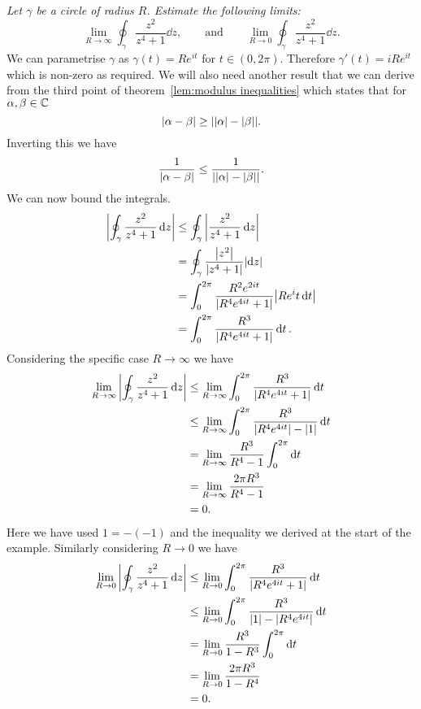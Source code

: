 \documentclass{article}
\begin{document}
    \begin{example}
        \textit{Let \(\gamma\) be a circle of radius \(R\).
        Estimate the following limits:}
        \[\lim_{R\to\infty} \oint_{\gamma} \frac{z^2}{z^4 + 1}\dd{z}, \qquad\text{and}\qquad \lim_{R\to 0} \oint_{\gamma} \frac{z^2}{z^4 + 1}\dd{z}.\]
        We can parametrise \(\gamma\) as \(\gamma(t) = Re^{it}\) for \(t\in(0, 2\pi)\).
        Therefore \(\gamma'(t) = iRe^{it}\) which is non-zero as required.
        We will also need another result that we can derive from the third point of theorem~\ref{lem:modulus inequalities} which states that for \(\alpha, \beta\in\mathbb{C}\) 
        \[\abs{\alpha - \beta} \ge \abs{\abs{\alpha} - \abs{\beta}}.\]
        Inverting this we have
        \[\frac{1}{\abs{\alpha - \beta}} \le \frac{1}{\abs{\abs{\alpha} - \abs{\beta}}}.\]
        We can now bound the integrals.
        \begin{align*}
            \abs{\oint_{\gamma} \frac{z^2}{z^4 + 1} \dd{z}} &\le \oint_{\gamma} \abs{\frac{z^2}{z^4 + 1} \dd{z}}\\
            &= \oint_{\gamma} \frac{\abs{z^2}}{\abs{z^4 + 1}}\abs{\dd{z}}\\
            &= \int_0^{2\pi} \frac{R^2e^{2it}}{\abs{R^4e^{4it} + 1}}\abs{Re^it\dd{t}}\\
            &= \int_0^{2\pi} \frac{R^3}{\abs{R^4e^{4it} + 1}}\dd{t}.
        \end{align*}
        Considering the specific case \(R\to\infty\) we have
        \begin{align*}
            \lim_{R\to\infty} \abs{\oint_{\gamma} \frac{z^2}{z^4 + 1} \dd{z}} &\le \lim_{R\to\infty} \int_0^{2\pi} \frac{R^3}{\abs{R^4e^{4it} + 1}}\dd{t}\\
            &\le \lim_{R\to\infty} \int_0^{2\pi} \frac{R^3}{\abs{R^4e^{4it}} - \abs{1}} \dd{t}\\
            &= \lim_{R\to\infty} \frac{R^3}{R^4 - 1} \int_0^{2\pi} \dd{t}\\
            &= \lim_{R\to\infty} \frac{2\pi R^3}{R^4 - 1}\\
            &= 0.
        \end{align*}
        Here we have used \(1 = -(-1)\) and the inequality we derived at the start of the example.
        Similarly considering \(R\to 0\) we have
        \begin{align*}
            \lim_{R\to 0} \abs{\oint_{\gamma} \frac{z^2}{z^4 + 1} \dd{z}} &\le \lim_{R\to 0} \int_0^{2\pi} \frac{R^3}{\abs{R^4e^{4it} + 1}}\dd{t}\\
            & \le \lim_{R\to 0} \int_0^{2\pi} \frac{R^3}{\abs{1} - \abs{R^4e^{4it}}}\dd{t}\\
            &= \lim_{R\to 0} \frac{R^3}{1 - R^3} \int_0^{2\pi} \dd{t}\\
            &=\lim_{R\to 0} \frac{2\pi R^3}{1 - R^4}\\
            &= 0.
        \end{align*}
    \end{example}
\end{document}
